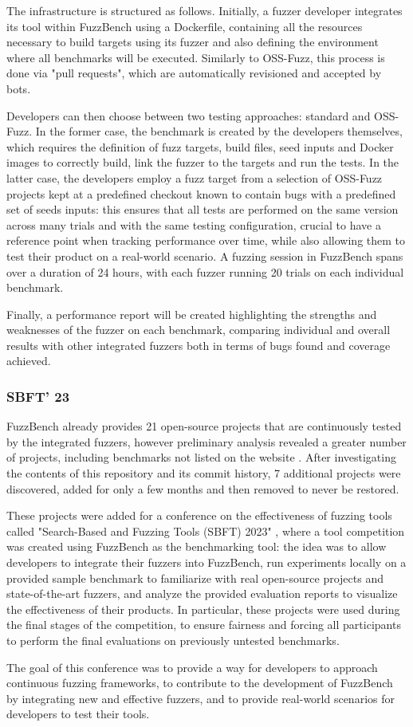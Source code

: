 The infrastructure is structured as follows.
Initially, a fuzzer developer integrates its tool within FuzzBench using a Dockerfile, containing all the resources necessary to build targets using its fuzzer and also defining the environment where all benchmarks will be executed. Similarly to OSS-Fuzz, this process is done via "pull requests", which are automatically revisioned and accepted by bots.

Developers can then choose between two testing approaches: standard and OSS-Fuzz. In the former case, the benchmark is created by the developers themselves, which requires the definition of fuzz targets, build files, seed inputs and Docker images to correctly build, link the fuzzer to the targets and run the tests. In the latter case, the developers employ a fuzz target from a selection of OSS-Fuzz projects kept at a predefined checkout known to contain bugs \cite{benchmarks} with a predefined set of seeds inputs: this ensures that all tests are performed on the same version across many trials and with the same testing configuration, crucial to have a reference point when tracking performance over time, while also allowing them to test their product on a real-world scenario. A fuzzing session in FuzzBench spans over a duration of 24 hours, with each fuzzer running 20 trials on each individual benchmark.

Finally, a performance report will be created highlighting the strengths and weaknesses of the fuzzer on each benchmark, comparing individual and overall results with other integrated fuzzers both in terms of bugs found and coverage achieved.



\subsubsection{SBFT' 23}
FuzzBench already provides 21 open-source projects that are continuously tested by the integrated fuzzers, however preliminary analysis revealed a greater number of projects, including benchmarks not listed on the website \cite{benchmarks}. After investigating the contents of this repository and its commit history, 7 additional projects were discovered, added for only a few months and then removed to never be restored.  

These projects were added for a conference on the effectiveness of fuzzing tools called "Search-Based and Fuzzing Tools (SBFT) 2023" \cite{sbft23}, where a tool competition was created using FuzzBench as the benchmarking tool: the idea was to allow developers to integrate their fuzzers into FuzzBench, run experiments locally on a provided sample benchmark to familiarize with real open-source projects and state-of-the-art fuzzers, and analyze the provided evaluation reports to visualize the effectiveness of their products. In particular, these projects were used during the final stages of the competition, to ensure fairness and forcing all participants to perform the final evaluations on previously untested benchmarks.

The goal of this conference was to provide a way for developers to approach continuous fuzzing frameworks, to contribute to the development of FuzzBench by integrating new and effective fuzzers, and to provide real-world scenarios for developers to test their tools.